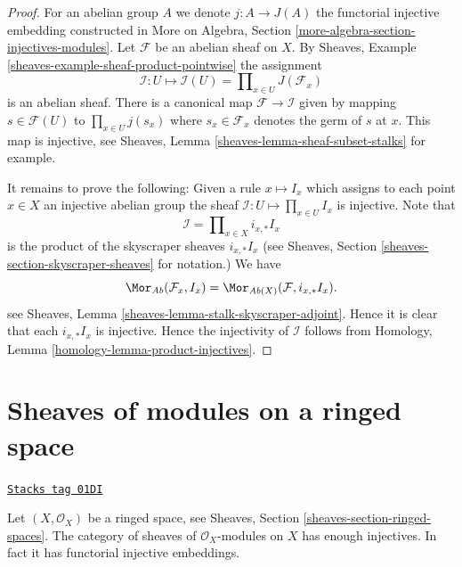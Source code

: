 \begin{proof}
For an abelian group $A$ we denote $j : A \to J(A)$ the functorial
injective embedding constructed in
More on Algebra, Section \ref{more-algebra-section-injectives-modules}.
Let $\mathcal{F}$ be an abelian sheaf on $X$.
By Sheaves, Example \ref{sheaves-example-sheaf-product-pointwise}
the assignment
$$
\mathcal{I} : U \mapsto
\mathcal{I}(U) = \prod\nolimits_{x\in U} J(\mathcal{F}_x)
$$
is an abelian sheaf. There is a canonical map $\mathcal{F} \to \mathcal{I}$
given by mapping $s \in \mathcal{F}(U)$ to $\prod_{x \in U} j(s_x)$
where $s_x \in \mathcal{F}_x$ denotes the germ of $s$ at $x$.
This map is injective, see
Sheaves, Lemma \ref{sheaves-lemma-sheaf-subset-stalks}
for example.

\medskip\noindent
It remains to prove the following: Given a rule
$x \mapsto I_x$ which assigns to each point $x \in X$ an injective
abelian group the sheaf $\mathcal{I} : U \mapsto \prod_{x \in U} I_x$
is injective. Note that
$$
\mathcal{I} = \prod\nolimits_{x \in X} i_{x, *}I_x
$$
is the product of the skyscraper sheaves $i_{x, *}I_x$ (see
Sheaves, Section \ref{sheaves-section-skyscraper-sheaves} for notation.)
We have
$$
\Mor_{\textit{Ab}}(\mathcal{F}_x, I_x)
=
\Mor_{\textit{Ab}(X)}(\mathcal{F}, i_{x, *}I_x).
$$
see Sheaves, Lemma \ref{sheaves-lemma-stalk-skyscraper-adjoint}. Hence it is
clear that each $i_{x, *}I_x$ is injective. Hence the injectivity of
$\mathcal{I}$ follows from
Homology, Lemma \ref{homology-lemma-product-injectives}.
\end{proof}

\section{Sheaves of modules on a ringed space}
\label{injectives-section-sheaves-modules-space}
\begin{lemma}
\label{injectives-lemma-sheaves-modules-space}
\href{https://stacks.math.columbia.edu/tag/01DI}{\texttt{Stacks tag 01DI}}

Let $(X, \mathcal{O}_X)$ be a ringed space, see
Sheaves, Section \ref{sheaves-section-ringed-spaces}.
The category of sheaves of $\mathcal{O}_X$-modules on $X$
has enough injectives. In fact it has functorial injective embeddings.
\end{lemma}

